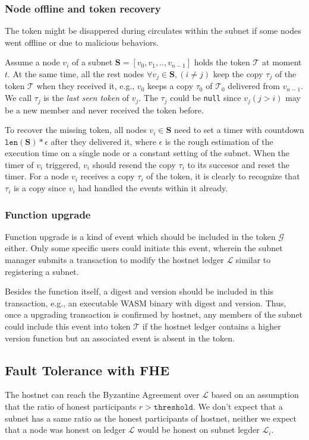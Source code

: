 \documentclass[11pt]{article}
\begin{document}
\subsubsection{Node offline and token recovery}
The token might be disappered during circulates within the subnet if some nodes went offline or due to malicious behaviors.

Assume a node $v_{i}$ of a subnet $\mathbf{S} = [v_{0}, v_{1}, .., v_{n-1}]$ holds the token $\mathcal{T}$ at moment $t$.
At the same time, all the rest nodes $\forall v_{j} \in \mathbf{S}, (i \ne j)$ keep the copy $\tau_{j}$ of the token $\mathcal{T}$ when they received it, e.g., $v_{0}$ keeps a copy $\tau_{0}$ of $\mathcal{T}_{0}$ delivered from $v_{n-1}$.
We call $\tau_{j}$ is the \textit{last seen token} of $v_{j}$.
The $\tau_{j}$ could be \texttt{null} since $v_{j}(j > i)$ may be a new member and never received the token before.

To recover the missing token, all nodes $v_{i} \in \mathbf{S}$ need to set a timer with countdown $\texttt{len}(\mathbf{S}) * \epsilon$ after they delivered it, where $\epsilon$ is the rough estimation of the execution time on a single node or a constant setting of the subnet.
When the timer of $v_{i}$ triggered, $v_{i}$ should resend the copy $\tau_{i}$ to its succesor and reset the timer.
For a node $v_{i}$ receives a copy $\tau_{i}$ of the token, it is clearly to recognize that $\tau_{i}$ is a copy since $v_{i}$ had handled the events within it already.


\subsubsection{Function upgrade}
Function upgrade is a kind of event which should be included in the token $\mathcal{G}$ either.
Only some specific users could initiate this event, wherein the subnet manager submits a transaction to modify the hostnet ledger $\mathcal{L}$ similar to registering a subnet.

Besides the function itself, a digest and version should be included in this transaction, e.g., an executable WASM binary with digest and version.
Thus, once a upgrading transaction is confirmed by hostnet, any members of the subnet could include this event into token $\mathcal{T}$ if the hostnet ledger contains a higher version function but an associated event is absent in the token.

\subsection{Fault Tolerance with FHE}
The hostnet can reach the Byzantine Agreement over $\mathcal{L}$ based on an assumption that the ratio of honest participants $r > \texttt{threshold}$.
We don{'}t expect that a subnet has a same ratio as the honest participants of hostnet, neither we expect that a node was honest on ledger $\mathcal{L}$ would be honest on subnet legder $\mathcal{L}_{i}$.
\end{document}
